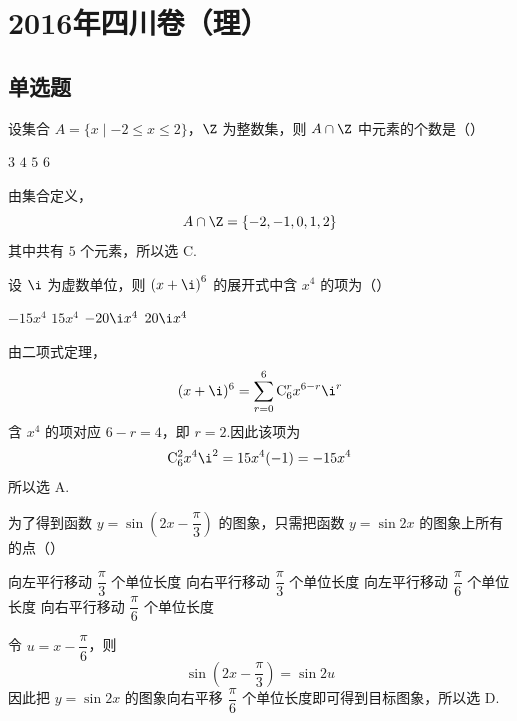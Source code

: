 \chapter{2016年四川卷（理）}

\section{单选题}

\begin{problem}
设集合 \(A=\{x\mid -2\le x\le 2\}\)，\(\Z\) 为整数集，则 \(A\cap\Z\) 中元素的个数是（\quad）

\choices
    {\(3\)}
    {\(4\)}
    {\(5\)}
    {\(6\)}

\begin{solution}
由集合定义，
\[
A\cap\Z=\{-2,-1,0,1,2\}
\]
其中共有 \(5\) 个元素，所以选 C.
\end{solution}
\end{problem}



\begin{problem}
设 \(\i\) 为虚数单位，则 \(\left(x+\i\right)^6\) 的展开式中含 \(x^4\) 的项为（\quad）

\choices
    {\(-15x^4\)}
    {\(15x^4\)}
    {\(-20\i x^4\)}
    {\(20\i x^4\)}

\begin{solution}
由二项式定理，
\[
(x+\i)^6=\sum_{r=0}^{6}\mathrm C_6^r x^{6-r}\i^r
\]
含 \(x^4\) 的项对应 \(6-r=4\)，即 \(r=2\).因此该项为
\[
\mathrm C_6^2x^4\i^2=15x^4(-1)=-15x^4
\]
所以选 A.
\end{solution}
\end{problem}



\begin{problem}
为了得到函数 \(y=\sin\left(2x-\dfrac{\pi}{3}\right)\) 的图象，只需把函数 \(y=\sin 2x\) 的图象上所有的点（\quad）

\choices
    {向左平行移动 \(\dfrac{\pi}{3}\) 个单位长度}
    {向右平行移动 \(\dfrac{\pi}{3}\) 个单位长度}
    {向左平行移动 \(\dfrac{\pi}{6}\) 个单位长度}
    {向右平行移动 \(\dfrac{\pi}{6}\) 个单位长度}

\begin{solution}
令 \(u=x-\dfrac{\pi}{6}\)，则
\[
\sin\left(2x-\dfrac{\pi}{3}\right)=\sin 2u
\]
因此把 \(y=\sin 2x\) 的图象向右平移 \(\dfrac{\pi}{6}\) 个单位长度即可得到目标图象，所以选 D.
\end{solution}
\end{problem}



